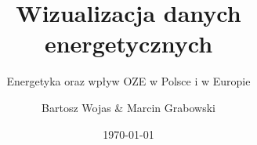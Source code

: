 
\title{Wizualizacja danych energetycznych}
\subtitle{Energetyka oraz wpływ OZE w Polsce i w Europie}
\author{Bartosz Wojas \& Marcin Grabowski}
\date{\today}